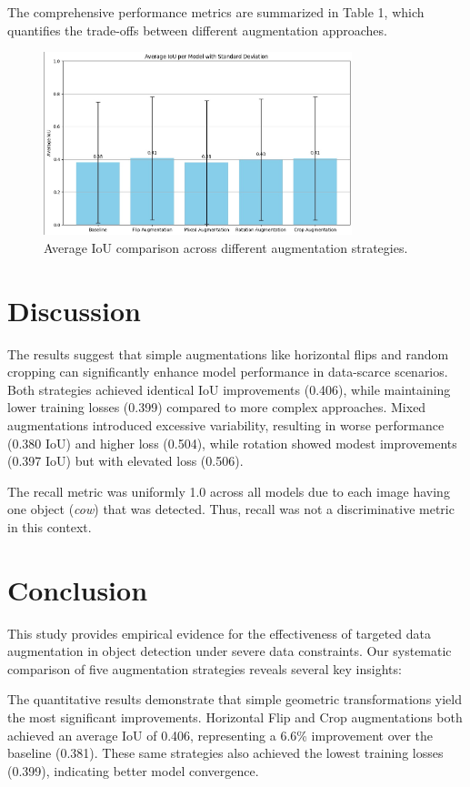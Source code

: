 \documentclass[12pt]{article}
\begin{document}
The comprehensive performance metrics are summarized in Table 1, which quantifies the trade-offs between different augmentation approaches.

\begin{figure}[H]
    \centering
    \includegraphics[width=0.8\textwidth]{avg_iou_per_model.jpg}
    \caption{Average IoU comparison across different augmentation strategies.}
    \label{fig:avg_iou}
\end{figure}


\section{Discussion}
The results suggest that simple augmentations like horizontal flips and random cropping can significantly enhance model performance in data-scarce scenarios. Both strategies achieved identical IoU improvements (0.406), while maintaining lower training losses (0.399) compared to more complex approaches. Mixed augmentations introduced excessive variability, resulting in worse performance (0.380 IoU) and higher loss (0.504), while rotation showed modest improvements (0.397 IoU) but with elevated loss (0.506).

The recall metric was uniformly 1.0 across all models due to each image having one object (\emph{cow}) that was detected. Thus, recall was not a discriminative metric in this context.

\section{Conclusion}
This study provides empirical evidence for the effectiveness of targeted data augmentation in object detection under severe data constraints. Our systematic comparison of five augmentation strategies reveals several key insights:

The quantitative results demonstrate that simple geometric transformations yield the most significant improvements. Horizontal Flip and Crop augmentations both achieved an average IoU of 0.406, representing a 6.6\% improvement over the baseline (0.381). These same strategies also achieved the lowest training losses (0.399), indicating better model convergence.
\end{document}
